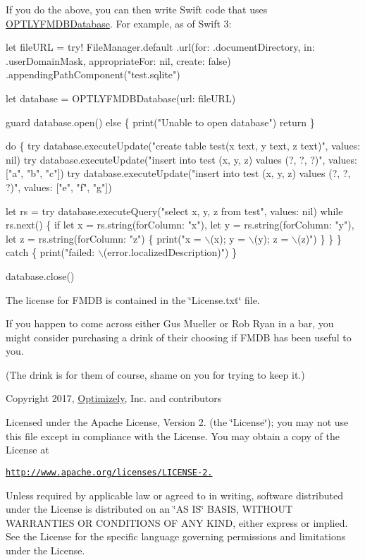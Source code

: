 If you do the above, you can then write Swift code that uses {\ttfamily \mbox{\hyperlink{interface_o_p_t_l_y_f_m_d_b_database}{O\+P\+T\+L\+Y\+F\+M\+D\+B\+Database}}}. For example, as of Swift 3\+:


\begin{DoxyCode}
let fileURL = try! FileManager.default
    .url(for: .documentDirectory, in: .userDomainMask, appropriateFor: nil, create: false)
    .appendingPathComponent("test.sqlite")

let database = OPTLYFMDBDatabase(url: fileURL)

guard database.open() else \{
    print("Unable to open database")
    return
\}

do \{
    try database.executeUpdate("create table test(x text, y text, z text)", values: nil)
    try database.executeUpdate("insert into test (x, y, z) values (?, ?, ?)", values: ["a", "b", "c"])
    try database.executeUpdate("insert into test (x, y, z) values (?, ?, ?)", values: ["e", "f", "g"])

    let rs = try database.executeQuery("select x, y, z from test", values: nil)
    while rs.next() \{
        if let x = rs.string(forColumn: "x"), let y = rs.string(forColumn: "y"), let z =
       rs.string(forColumn: "z") \{
            print("x = \(\backslash\)(x); y = \(\backslash\)(y); z = \(\backslash\)(z)")
        \}
    \}
\} catch \{
    print("failed: \(\backslash\)(error.localizedDescription)")
\}

database.close()
\end{DoxyCode}


The license for F\+M\+DB is contained in the \char`\"{}\+License.\+txt\char`\"{} file.

If you happen to come across either Gus Mueller or Rob Ryan in a bar, you might consider purchasing a drink of their choosing if F\+M\+DB has been useful to you.

(The drink is for them of course, shame on you for trying to keep it.)

Copyright 2017, \mbox{\hyperlink{interface_optimizely}{Optimizely}}, Inc. and contributors

Licensed under the Apache License, Version 2. (the \char`\"{}\+License\char`\"{}); you may not use this file except in compliance with the License. You may obtain a copy of the License at

\href{http://www.apache.org/licenses/LICENSE-2.0}{\tt http\+://www.\+apache.\+org/licenses/\+L\+I\+C\+E\+N\+S\+E-\/2.}

Unless required by applicable law or agreed to in writing, software distributed under the License is distributed on an \char`\"{}\+A\+S I\+S\char`\"{} B\+A\+S\+IS, W\+I\+T\+H\+O\+UT W\+A\+R\+R\+A\+N\+T\+I\+ES OR C\+O\+N\+D\+I\+T\+I\+O\+NS OF A\+NY K\+I\+ND, either express or implied. See the License for the specific language governing permissions and limitations under the License. 